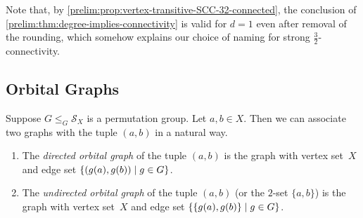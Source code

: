 Note that, by \cref{prelim:prop:vertex-transitive-SCC-32-connected},
the conclusion of \cref{prelim:thm:degree-implies-connectivity}
is valid for $d = 1$ even after removal of the 
rounding, which somehow explains
our choice of naming for strong $\frac{3}{2}$-connectivity.

\subsection{Orbital Graphs}
\label{prelim:sec:orbitalgraphs}

Suppose $G \le_G \mathcal S_X$ is a permutation group.
Let $a,b \in X$. Then we can associate two graphs with the tuple $(a,b)$
in a natural way.

\begin{enumerate} 
	\item The \emph{directed orbital graph} of the tuple $(a,b)$
	is the graph with vertex set~$X$ and edge set $\{ (\applyfunc{a}{g}, \applyfunc{b}{g}) \mid g \in G \}$.
	
	\item The \emph{undirected orbital graph} of the tuple $(a,b)$ (or the $2$-set $\{a,b\}$)
	is the graph with vertex set~$X$ and edge set $\{ \{ \applyfunc{a}{g}, \applyfunc{b}{g} \} \mid g \in G \}$.	
\end{enumerate} 

